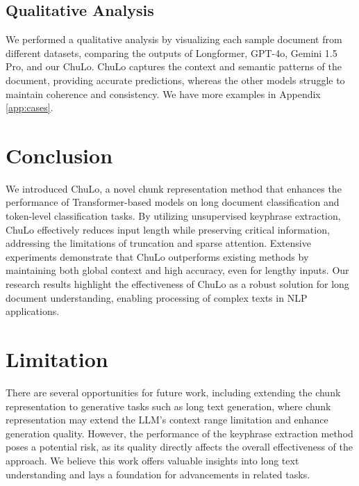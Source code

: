 \documentclass[11pt]{article}
\begin{document}
\subsection{Qualitative Analysis}
We performed a qualitative analysis by visualizing each sample document from different datasets, comparing the outputs of Longformer, GPT-4o, Gemini 1.5 Pro, and our ChuLo. ChuLo captures the context and semantic patterns of the document, providing accurate predictions, whereas the other models struggle to maintain coherence and consistency. We have more examples in Appendix \ref{app:cases}.


\section{Conclusion}
We introduced ChuLo, a novel chunk representation method that enhances the performance of Transformer-based models on long document classification and token-level classification tasks. By utilizing unsupervised keyphrase extraction, ChuLo effectively reduces input length while preserving critical information, addressing the limitations of truncation and sparse attention. Extensive experiments demonstrate that ChuLo outperforms existing methods by maintaining both global context and high accuracy, even for lengthy inputs. Our research results highlight the effectiveness of ChuLo as a robust solution for long document understanding, enabling processing of complex texts in NLP applications.

\section{Limitation}
There are several opportunities for future work, including extending the chunk representation to generative tasks such as long text generation, where chunk representation may extend the LLM's context range limitation and enhance generation quality. However, the performance of the keyphrase extraction method poses a potential risk, as its quality directly affects the overall effectiveness of the approach. We believe this work offers valuable insights into long text understanding and lays a foundation for advancements in related tasks.
\end{document}
